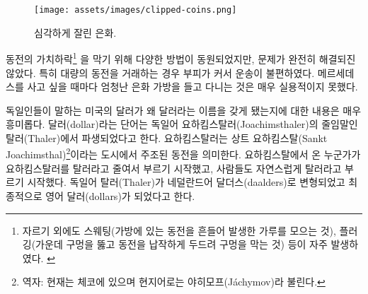 \begin{figure}
  \texttt{[image: assets/images/clipped-coins.png]}
  \caption{심각하게 잘린 은화.}
  \label{fig:clipped-coins}
\end{figure}

\begin{comment}
Even with these methods of coin debasement\footnote{Besides clipping, sweating
(shaking the coins in a bag and collecting the dust worn off) and plugging
(punching a hole in the middle and hammering the coin flat to close the hole)
were the most prominent methods of coin debasement. \cite{wiki:coin-debasement}}
kept in check, coins still suffer from other issues. They are bulky and not very
convenient to transport, especially when large transfers of value need to
happen. Showing up with a huge bag of silver dollars every time you want to buy
a Mercedes isn't very practical.
\end{comment}
동전의 가치하락\footnote{자르기 외에도 스웨팅(가방에 있는 동전을 흔들어 발생한 가루를 모으는 것),
	플러깅(가운데 구멍을 뚫고 동전을 납작하게 두드려 구멍을 막는 것) 등이 자주 발생하였다.
	\cite{wiki:coin-debasement}}
을 막기 위해 다양한 방법이 동원되었지만, 문제가 완전히 해결되진 않았다.
특히 대량의 동전을 거래하는 경우 부피가 커서 운송이 불편하였다.
메르세데스를 사고 싶을 때마다 엄청난 은화 가방을 들고 다니는 것은 매우 실용적이지 못했다.

\begin{comment}
Speaking of German things: How the United States \textit{dollar} got its name is
another interesting story. The word \enquote{dollar} is derived from the German word
\textit{Thaler}, short for a \textit{Joachimsthaler}~\cite{wiki:thaler}. A
Joachimsthaler was a coin minted in the town of \textit{Sankt Joachimsthal}.
Thaler is simply a shorthand for someone (or something) coming from the valley,
and because Joachimsthal was \textit{the} valley for silver coin production,
people simply referred to these silver coins as \textit{Thaler.} Thaler (German)
morphed into daalders (Dutch), and finally dollars (English).
\end{comment}
독일인들이 말하는 미국의 달러가 왜 달러라는 이름을 갖게 됐는지에 대한 내용은 매우 흥미롭다.
달러(dollar)라는 단어는 독일어 요하킴스탈러(Joachimsthaler)의 줄임말인 탈러(Thaler)에서 파생되었다고 한다\cite{wiki:thaler}. 
요하킴스탈러는 상트 요하킴스탈(Sankt Joachimsthal)\footnote{역자: 현재는 체코에 있으며 현지어로는 야히모프(Jáchymov)라 불린다.}이라는 도시에서 주조된 동전을 의미한다.
요하킴스탈에서 온 누군가가 요하킴스탈러를 탈러라고 줄여서 부르기 시작했고, 
사람들도 자연스럽게 탈러라고 부르기 시작했다.
독일어 탈러(Thaler)가 네덜란드어 달더스(daalders)로 변형되었고 최종적으로 영어 달러(dollars)가 되었다고 한다.

